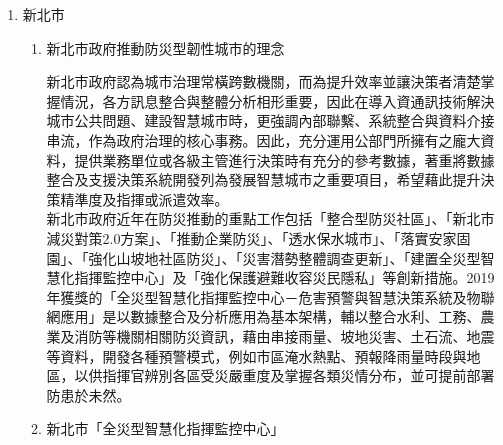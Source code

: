 \documentclass[a4paper,12pt]{article}
\begin{document}
\begin{enumerate}
\item 新北市
\label{sec:orgfd7ff6b}
\begin{enumerate}
\item 新北市政府推動防災型韌性城市的理念
\label{sec:orga7937b0}

新北市政府認為城市治理常橫跨數機關，而為提升效率並讓決策者清楚掌握情況，各方訊息整合與整體分析相形重要，因此在導入資通訊技術解決城市公共問題、建設智慧城市時，更強調內部聯繫、系統整合與資料介接串流，作為政府治理的核心事務。因此，充分運用公部門所擁有之龐大資料，提供業務單位或各級主管進行決策時有充分的參考數據，著重將數據整合及支援決策系統開發列為發展智慧城市之重要項目，希望藉此提升決策精準度及指揮或派遣效率。\\

新北市政府近年在防災推動的重點工作包括「整合型防災社區」、「新北市減災對策2.0方案」、「推動企業防災」、「透水保水城市」、「落實安家固園」、「強化山坡地社區防災」、「災害潛勢整體調查更新」、「建置全災型智慧化指揮監控中心」及「強化保護避難收容災民隱私」等創新措施。2019年獲獎的「全災型智慧化指揮監控中心－危害預警與智慧決策系統及物聯網應用」是以數據整合及分析應用為基本架構，輔以整合水利、工務、農業及消防等機關相關防災資訊，藉由串接雨量、坡地災害、土石流、地震等資料，開發各種預警模式，例如市區淹水熱點、預報降雨量時段與地區，以供指揮官辨別各區受災嚴重度及掌握各類災情分布，並可提前部署防患於未然。\\
\item 新北市「全災型智慧化指揮監控中心」
\label{sec:org031df9b}


\end{enumerate}
\end{enumerate}
\end{document}
